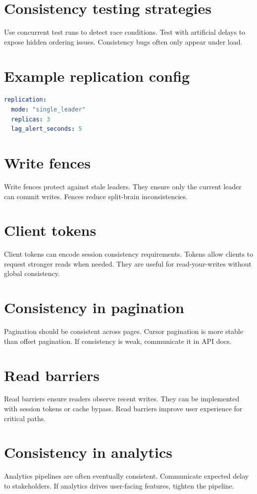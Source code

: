 \section{Consistency testing strategies}
Use concurrent test runs to detect race conditions.
Test with artificial delays to expose hidden ordering issues.
Consistency bugs often only appear under load.

\section{Example replication config}
\begin{lstlisting}[language=YAML]
replication:
  mode: "single_leader"
  replicas: 3
  lag_alert_seconds: 5
\end{lstlisting}

\section{Write fences}
Write fences protect against stale leaders.
They ensure only the current leader can commit writes.
Fences reduce split-brain inconsistencies.

\section{Client tokens}
Client tokens can encode session consistency requirements.
Tokens allow clients to request stronger reads when needed.
They are useful for read-your-writes without global consistency.

\section{Consistency in pagination}
Pagination should be consistent across pages.
Cursor pagination is more stable than offset pagination.
If consistency is weak, communicate it in API docs.

\section{Read barriers}
Read barriers ensure readers observe recent writes.
They can be implemented with session tokens or cache bypass.
Read barriers improve user experience for critical paths.

\section{Consistency in analytics}
Analytics pipelines are often eventually consistent.
Communicate expected delay to stakeholders.
If analytics drives user-facing features, tighten the pipeline.

